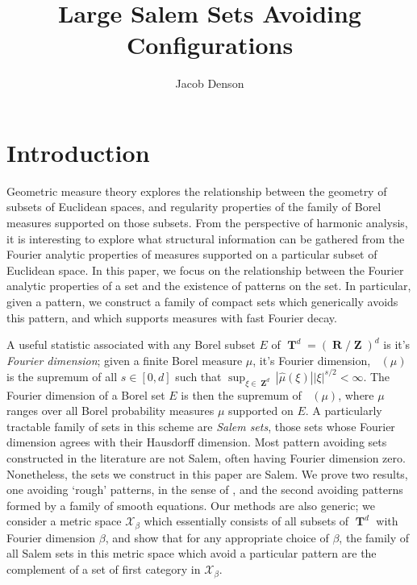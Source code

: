 \documentclass[12pt,reqno]{article}
\title{Large Salem Sets Avoiding Configurations}
\author{Jacob Denson}
\numberwithin{equation}{section}
\DeclareMathOperator{\fordim}{\dim_{\mathbf{F}}}
\DeclareMathOperator{\RR}{\mathbf{R}}
\DeclareMathOperator{\ZZ}{\mathbf{Z}}
\DeclareMathOperator{\TT}{\mathbf{T}}
\numberwithin{theorem}{section}
\begin{document}
\maketitle

\section{Introduction}

Geometric measure theory explores the relationship between the geometry of subsets of Euclidean spaces, and regularity properties of the family of Borel measures supported on those subsets. From the perspective of harmonic analysis, it is interesting to explore what structural information can be gathered from the Fourier analytic properties of measures supported on a particular subset of Euclidean space. In this paper, we focus on the relationship between the Fourier analytic properties of a set and the existence of patterns on the set. In particular, given a pattern, we construct a family of compact sets which generically avoids this pattern, and which supports measures with fast Fourier decay.

A useful statistic associated with any Borel subset $E$ of $\TT^d = (\RR/\ZZ)^d$ is it's \emph{Fourier dimension}; given a finite Borel measure $\mu$, it's Fourier dimension, $\fordim(\mu)$ is the supremum of all $s \in [0,d]$ such that $\sup_{\xi \in \ZZ^d} |\widehat{\mu}(\xi)| |\xi|^{s/2} < \infty$. The Fourier dimension of a Borel set $E$ is then the supremum of $\fordim(\mu)$, where $\mu$ ranges over all Borel probability measures $\mu$ supported on $E$. A particularly tractable family of sets in this scheme are \emph{Salem sets}, those sets whose Fourier dimension agrees with their Hausdorff dimension. Most pattern avoiding sets constructed in the literature are not Salem, often having Fourier dimension zero. Nonetheless, the sets we construct in this paper are Salem. We prove two results, one avoiding `rough' patterns, in the sense of \cite{OurPaper}, and the second avoiding patterns formed by a family of smooth equations. Our methods are also generic; we consider a metric space $\mathcal{X}_\beta$ which essentially consists of all subsets of $\TT^d$ with Fourier dimension $\beta$, and show that for any appropriate choice of $\beta$, the family of all Salem sets in this metric space which avoid a particular pattern are the complement of a set of first category in $\mathcal{X}_\beta$.
\end{document}
